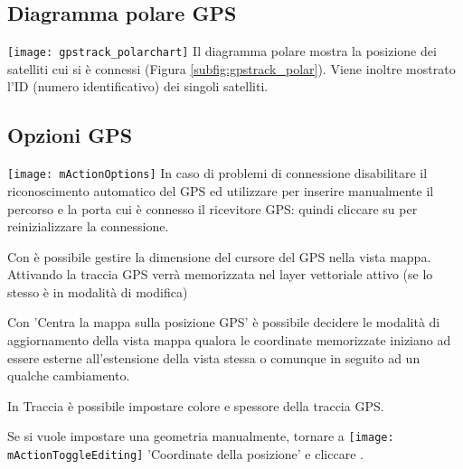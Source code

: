 \subsection{Diagramma polare GPS}
\texttt{[image: gpstrack\_polarchart]} Il diagramma 
polare mostra la posizione dei satelliti cui si è connessi 
(Figura \ref{subfig:gpstrack_polar}). Viene inoltre mostrato 
l'ID (numero identificativo) dei singoli satelliti.

\subsection{Opzioni GPS}
\texttt{[image: mActionOptions]} In caso di problemi 
di connessione disabilitare il riconoscimento automatico del 
GPS  ed utilizzare  
 per inserire manualmente 
il percorso e la porta cui è connesso il ricevitore GPS: quindi cliccare su
 per reinizializzare la connessione.

Con  è possibile gestire la dimensione del 
cursore del GPS nella vista mappa. 
Attivando  la traccia GPS 
verrà memorizzata nel layer vettoriale attivo (se lo stesso è in modalità di modifica)

Con 'Centra la mappa sulla posizione GPS' è possibile decidere le modalità di 
aggiornamento della vista mappa qualora le coordinate memorizzate iniziano 
ad essere esterne all'estensione della vista stessa o comunque in seguito ad un
qualche cambiamento.

In Traccia è possibile impostare colore e spessore della traccia GPS.

Se si vuole impostare una geometria manualmente, tornare a 
\texttt{[image: mActionToggleEditing]} 'Coordinate della posizione'
e cliccare .

\FloatBarrier
